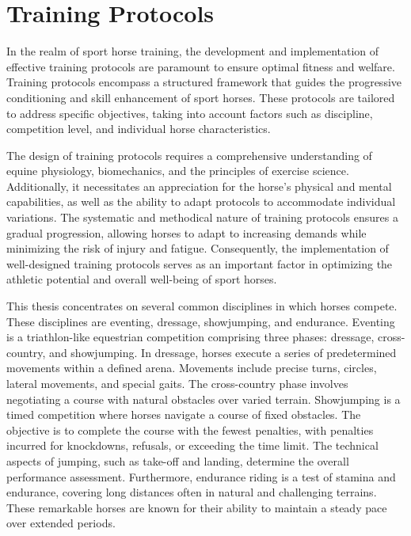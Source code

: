 \section{Training Protocols}

In the realm of sport horse training, the development and implementation of effective training protocols are paramount to ensure optimal fitness and welfare. Training protocols encompass a structured framework that guides the progressive conditioning and skill enhancement of sport horses. These protocols are tailored to address specific objectives, taking into account factors such as discipline, competition level, and individual horse characteristics. 

The design of training protocols requires a comprehensive understanding of equine physiology, biomechanics, and the principles of exercise science. Additionally, it necessitates an appreciation for the horse's physical and mental capabilities, as well as the ability to adapt protocols to accommodate individual variations. The systematic and methodical nature of training protocols ensures a gradual progression, allowing horses to adapt to increasing demands while minimizing the risk of injury and fatigue. Consequently, the implementation of well-designed training protocols serves as an important factor in optimizing the athletic potential and overall well-being of sport horses.

This thesis concentrates on several common disciplines in which horses compete. These disciplines are eventing, dressage, showjumping, and endurance. Eventing is a triathlon-like equestrian competition comprising three phases: dressage, cross-country, and showjumping. In dressage, horses execute a series of predetermined movements within a defined arena. Movements include precise turns, circles, lateral movements, and special gaits. The cross-country phase involves negotiating a course with natural obstacles over varied terrain. Showjumping is a timed competition where horses navigate a course of fixed obstacles. The objective is to complete the course with the fewest penalties, with penalties incurred for knockdowns, refusals, or exceeding the time limit. The technical aspects of jumping, such as take-off and landing, determine the overall performance assessment. Furthermore, endurance riding is a test of stamina and endurance, covering long distances often in natural and challenging terrains. These remarkable horses are known for their ability to maintain a steady pace over extended periods.


